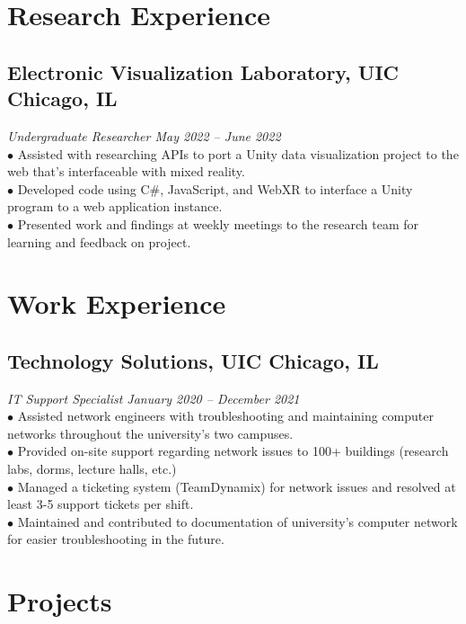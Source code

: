 \documentclass{article}
\begin{document}
\section{Research Experience}
\subsection{Electronic Visualization Laboratory, UIC \hfill \textnormal{Chicago, IL}}
\vspace{-0.5em}
\textit{Undergraduate Researcher \hfill May 2022 -- June 2022}
\\
$\bullet$ Assisted with researching APIs to port a Unity data visualization project to the web that's interfaceable with mixed reality.
\\
$\bullet$ Developed code using C\#, JavaScript, and WebXR to interface a Unity program to a web application instance.
\\
$\bullet$ Presented work and findings at weekly meetings to the research team for learning and feedback on project.


\section{Work Experience}
\subsection{Technology Solutions, UIC \hfill \textnormal{Chicago, IL}}
\vspace{-0.5em}
\textit{IT Support Specialist \hfill January 2020 -- December 2021}
\\
$\bullet$ Assisted network engineers with troubleshooting and maintaining computer networks throughout the university's two campuses.
\\
$\bullet$ Provided on-site support regarding network issues to 100+ buildings (research labs, dorms, lecture halls, etc.)
\\
$\bullet$ Managed a ticketing system (TeamDynamix) for network issues and resolved at least 3-5 support tickets per shift.
\\
$\bullet$ Maintained and contributed to documentation of university's computer network for easier troubleshooting in the future.


\section{Projects}
\end{document}
